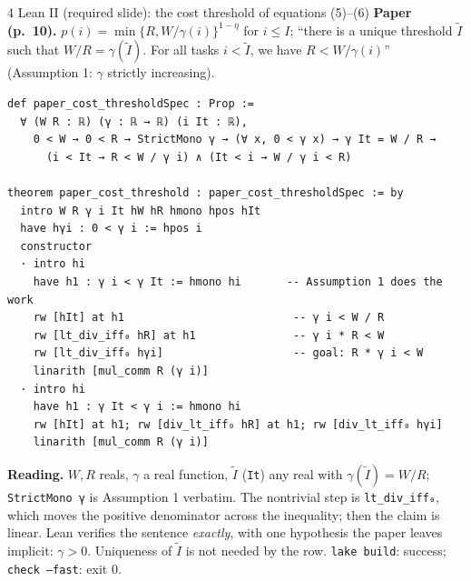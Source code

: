 \documentclass[aspectratio=169,11pt]{beamer}
\begin{document}
\begin{frame}[fragile]{4 \textperiodcentered{} Lean II (required slide): the cost threshold of equations (5)--(6)}
  \scriptsize
  \textbf{Paper (p.\ 10).} $p(i)=\min\{R,W/\gamma(i)\}^{1-\eta}$ for $i\le I$; ``there is a unique threshold
  $\tilde I$ such that $W/R=\gamma(\tilde I)$. For all tasks $i<\tilde I$, we have $R<W/\gamma(i)$''
  (Assumption 1: $\gamma$ strictly increasing).
  \vspace{-2pt}
  \begin{lstlisting}[basicstyle=\ttfamily\tiny]
def paper_cost_thresholdSpec : Prop :=
  ∀ (W R : ℝ) (γ : ℝ → ℝ) (i It : ℝ),
    0 < W → 0 < R → StrictMono γ → (∀ x, 0 < γ x) → γ It = W / R →
      (i < It → R < W / γ i) ∧ (It < i → W / γ i < R)

theorem paper_cost_threshold : paper_cost_thresholdSpec := by
  intro W R γ i It hW hR hmono hpos hIt
  have hγi : 0 < γ i := hpos i
  constructor
  · intro hi
    have h1 : γ i < γ It := hmono hi       -- Assumption 1 does the work
    rw [hIt] at h1                          -- γ i < W / R
    rw [lt_div_iff₀ hR] at h1               -- γ i * R < W
    rw [lt_div_iff₀ hγi]                    -- goal: R * γ i < W
    linarith [mul_comm R (γ i)]
  · intro hi
    have h1 : γ It < γ i := hmono hi
    rw [hIt] at h1; rw [div_lt_iff₀ hR] at h1; rw [div_lt_iff₀ hγi]
    linarith [mul_comm R (γ i)]
  \end{lstlisting}
  \vspace{-4pt}
  \textbf{Reading.} $W,R$ reals, $\gamma$ a real function, $\tilde I$ (\texttt{It}) any real with $\gamma(\tilde I)=W/R$;
  \texttt{StrictMono γ} is Assumption 1 verbatim. The nontrivial step is \texttt{lt\_div\_iff₀}, which moves the positive
  denominator across the inequality; then the claim is linear. Lean verifies the sentence \emph{exactly}, with one
  hypothesis the paper leaves implicit: $\gamma>0$. Uniqueness of $\tilde I$ is not needed by the row.
  \texttt{lake build}: success; \texttt{check --fast}: exit 0.
\end{frame}
\end{document}
